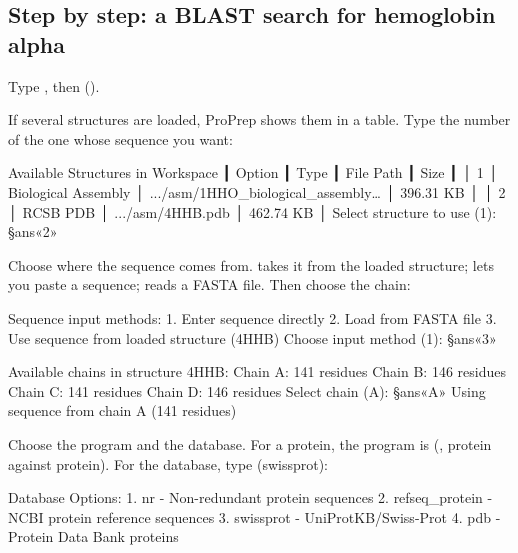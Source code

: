\subsection{Step by step: a BLAST search for hemoglobin alpha}

\begin{steps}
  \item Type , then  ().
  \item If several structures are loaded, ProPrep shows them in a table. Type
        the number of the one whose sequence you want:
\begin{screen}
                   Available Structures in Workspace
┃ Option ┃ Type                ┃ File Path                         ┃      Size ┃
│   1    │ Biological Assembly │ .../asm/1HHO_biological_assembly… │ 396.31 KB │
│   2    │ RCSB PDB            │ .../asm/4HHB.pdb                  │ 462.74 KB │
Select structure to use (1): §ans«2»
\end{screen}
  \item Choose where the sequence comes from.  takes it from the loaded
        structure;  lets you paste a sequence;  reads a FASTA
        file. Then choose the chain:
\begin{screen}
Sequence input methods:
1. Enter sequence directly
2. Load from FASTA file
3. Use sequence from loaded structure (4HHB)
Choose input method (1): §ans«3»

Available chains in structure 4HHB:
Chain A: 141 residues
Chain B: 146 residues
Chain C: 141 residues
Chain D: 146 residues
Select chain (A): §ans«A»
Using sequence from chain A (141 residues)
\end{screen}
  \item Choose the program and the database. For a protein, the program is
         (, protein against protein). For the database,
        type  (swissprot):
\begin{screen}
Database Options:
1. nr - Non-redundant protein sequences
2. refseq_protein - NCBI protein reference sequences
3. swissprot - UniProtKB/Swiss-Prot
4. pdb - Protein Data Bank proteins


\end{screen}
\end{steps}
